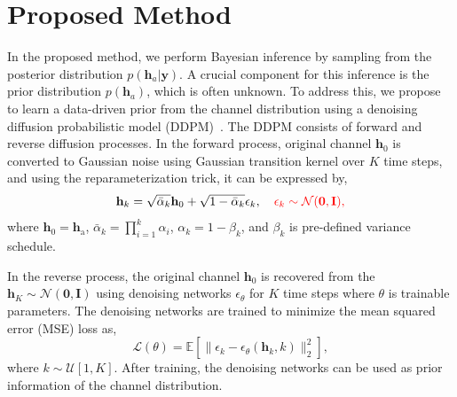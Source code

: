 \documentclass[lettersize,journal]{IEEEtran}
\newcommand{\tred}{\textcolor{red}}
\begin{document}
\section{Proposed Method}

In the proposed method, we perform Bayesian inference by sampling from the posterior distribution $p(\mathbf{h}_{a}|\mathbf{y})$. A crucial component for this inference is the prior distribution $p(\mathbf{h}_{a})$, which is often unknown. To address this, we propose to learn a data-driven prior from the channel distribution using a denoising diffusion probabilistic model (DDPM)~\cite{hoDenoisingDiffusionProbabilistic2020}. The DDPM consists of forward and reverse diffusion processes. In the forward process, original channel $\mathbf{h}_{0}$ is converted to Gaussian noise using Gaussian transition kernel over $K$ time steps, and using the reparameterization trick, it can be expressed by,
\begin{equation}
\mathbf{h}_{k} = \sqrt{ \bar{\alpha}_{k} }\mathbf{h}_{0} + \sqrt{ 1-\bar{\alpha}_{k} }\epsilon_{k},\quad \tred{\epsilon_{k}\sim\mathcal{N}(\mathbf{0},\mathbf{I}),}
\end{equation}
where $\mathbf{h}_{0} = \mathbf{h}_{\text{a}}$, $\bar{\alpha}_{k}=\prod_{i=1}^{k}\alpha_{i}$, $\alpha_{k}=1-\beta_{k}$, and $\beta_{k}$ is pre-defined variance schedule.

In the reverse process, the original channel $\mathbf{h}_{0}$ is recovered from the $\mathbf{h}_{K}\sim\mathcal{N}(\mathbf{0},\mathbf{I})$ using denoising networks $\epsilon_{\theta}$ for $K$ time steps where $\theta$ is trainable parameters. The denoising networks are trained to minimize the mean squared error (MSE) loss as,
\begin{equation}
\mathcal{L}(\theta) = \mathbb{E}[\|\epsilon_{k} - \epsilon_{\theta}(\mathbf{h}_{k},k)\|_{2}^{2}],
\end{equation}
where $k\sim\mathcal{U}[1,K]$. After training, the denoising networks can be used as prior information of the channel distribution.
\end{document}
